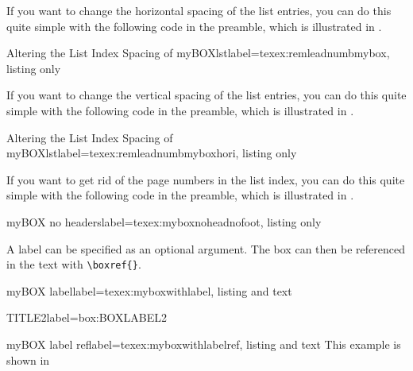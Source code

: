 \documentclass[]{myHOWTO-V001}
\begin{document}
If you want to change the horizontal spacing of the list entries, you can do this quite simple with the following code in the preamble, which is illustrated in .

\begin{myTEXEXdoclst}{Altering the List Index Spacing of myBOXlst}{label={texex:remleadnumbmybox}, listing only}
\makeatletter
	\renewcommand{\l@myBOX}{\@dottedtocline{1}{0mm}{0mm}}
\makeatother
\end{myTEXEXdoclst}

If you want to change the vertical spacing of the list entries, you can do this quite simple with the following code in the preamble, which is illustrated in .

\begin{myTEXEXdoclst}{Altering the List Index Spacing of myBOXlst}{label={texex:remleadnumbmyboxhori}, listing only}
\makeatletter
\makeatother
\end{myTEXEXdoclst}

If you want to get rid of the page numbers in the list index, you can do this quite simple with the following code in the preamble, which is illustrated in .

\begin{myTEXEXdoclst}{myBOX no headers}{label={texex:myboxnoheadnofoot}, listing only}
\let\oldlistofmyBOX\listofmyBOX

\renewcommand\listofmyBOX
{
	\pagestyle{empty} %
	\oldlistofmyBOX %
	\clearpage %
	\pagestyle{plain} %
}
\end{myTEXEXdoclst}

A label can be specified as an optional argument. The box can then be referenced in the text with \Verb|\boxref{}|.

\begin{myTEXEXdoclst}{myBOX label}{label={texex:myboxwithlabel}, listing and text}
\begin{myBOXlst}{TITLE2}{label={box:BOXLABEL2}}
	\lipsum[4]
\end{myBOXlst}
\end{myTEXEXdoclst}

\begin{myTEXEXdoclst}{myBOX label ref}{label={texex:myboxwithlabelref}, listing and text}
This example is shown in 
\end{myTEXEXdoclst}
\end{document}
